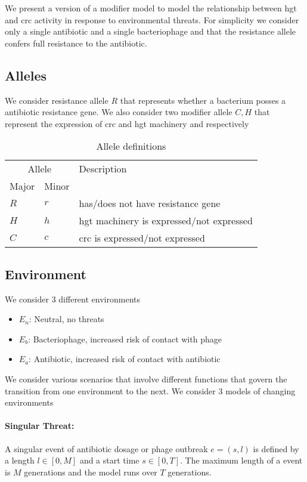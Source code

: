 We present a version of a modifier model to model the relationship between \ac{hgt} and \ac{crc} activity in response to environmental threats.
For simplicity we consider only a single antibiotic and a single bacteriophage and that the resistance allele confers full resistance to the antibiotic.
\subsection{Alleles}
We consider resistance allele $R$ that represents whether a bacterium posses a antibiotic resistance gene.
We also consider two modifier allele $C,H$ that represent the expression of \ac{crc} and \ac{hgt} machinery and  respectively
\begin{table}[H]
    \centering
    \begin{tabular}{@{}lll@{}}
        \toprule
        \multicolumn{2}{c}{Allele} & Description \\
        \cmidrule(l){1-2}
        Major & Minor & \\
        \midrule
        $R$ & $r$ & has/does not have resistance gene \\
        $H$ & $h$ & \ac{hgt} machinery is expressed/not expressed  \\
        $C$ & $c$ & \ac{crc} is expressed/not expressed \\
        \bottomrule
    \end{tabular}
    \caption{Allele definitions}
\end{table}
\FloatBarrier

\subsection{Environment}
We consider 3 different environments
\begin{itemize}
    \item $E_n$: Neutral, no threats
    \item $E_b$: Bacteriophage, increased risk of contact with phage
    \item $E_a$: Antibiotic, increased risk of contact with antibiotic
\end{itemize}
We consider various scenarios that involve different functions that govern the transition from one environment to the next.
We consider 3 models of changing environments
\paragraph{Singular Threat:}
A singular event of antibiotic dosage or phage outbreak $e=(s,l)$ is defined by a length $l \in [0,M]$ and a start time $s \in [0,T]$.
The maximum length of a event is $M$ generations and the model runs over $T$ generations.
